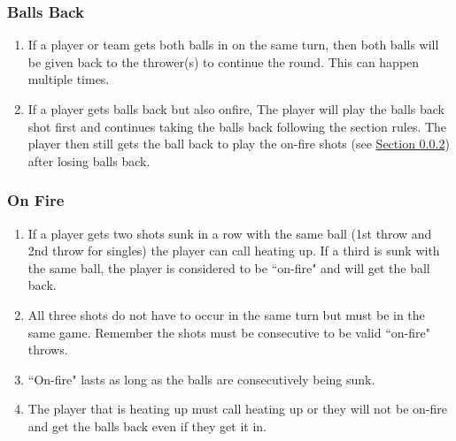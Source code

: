         \subsubsection{Balls Back}\label{sssec:BallsBack}
        \begin{enumerate}[label=(\roman*), ref=\roman*]
            \item \label{itm:BallsBack,bothin} If a player or team gets both balls in on the same turn, then both balls will be given back to the thrower(s) to continue the round.
                This can happen multiple times.
            \item \label{itm:BallsBack,onfire_combine} If a player gets balls back but also onfire, The player will play the balls back shot first and continues taking the balls back following the section rules.
                The player then still gets the ball back to play the on-fire shots (see \hyperref[sssec:OneFire]{Section \ref*{sssec:OnFire}}) after losing balls back.
        \end{enumerate}
        \subsubsection{On Fire}\label{sssec:OnFire}
        \begin{enumerate}[label=(\roman*), ref=\roman*]
            \item \label{itm:BallsBack,onfire} If a player gets two shots sunk in a row with the same ball (1st throw and 2nd throw for singles) the player can call heating up.
                If a third is sunk with the same ball, the player is considered to be ``on-fire" and will get the ball back. 
            \item \label{itm:BallsBack,onfire_reset} All three shots do not have to occur in the same turn but must be in the same game. Remember the shots must be consecutive to be valid ``on-fire" throws.
            \item \label{itm:BallsBack,onfire_multiple} ``On-fire" lasts as long as the balls are consecutively being sunk. 
            \item \label{itm:BallsBack,onfire_calling} The player that is heating up must call heating up or they will not be on-fire and get the balls back even if they get it in.
        \end{enumerate}
